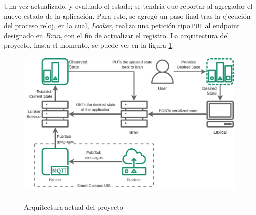 Una vez actualizado, y evaluado el estado; se tendría que reportar al agregador el nuevo estado de la aplicación. Para esto, se agregó un paso final tras la ejecución del proceso reloj, en la cual, \textit{Looker}, realiza una petición tipo \texttt{PUT} al endpoint designado en \textit{Bran}, con el fin de actualizar el registro. La arquitectura del proyecto, hasta el momento, se puede ver en la figura \ref{fig:StarDuckBasic}.

\begin{figure}[ht]
    \centering
    \caption{\\Arquitectura actual del proyecto}
    \label{fig:StarDuckBasic}
    \includegraphics[width=0.8\linewidth]{images/StarDuckBasic.pdf}
\end{figure}



